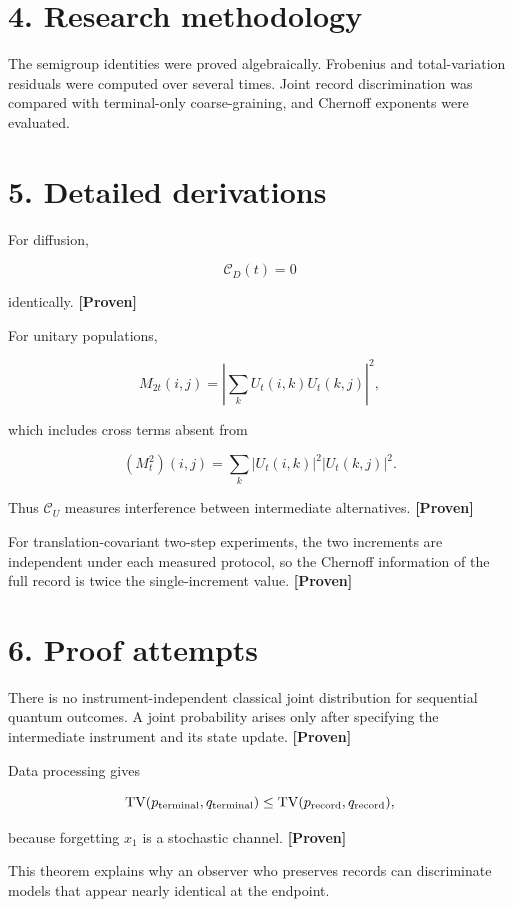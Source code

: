 \documentclass[11pt,a4paper,openany]{report}
\newcommand{\statusProven}{\textcolor{fingreen}{[Proven]}}
\begin{document}
\section{4. Research methodology}

The semigroup identities were proved algebraically. Frobenius and total-variation residuals were computed over several times. Joint record discrimination was compared with terminal-only coarse-graining, and Chernoff exponents were evaluated.

\section{5. Detailed derivations}

For diffusion,

\[
\mathcal C_D(t)=0
\]

identically. \textbf{\statusProven{}}

For unitary populations,

\[
M_{2t}(i,j)
=\left|\sum_kU_t(i,k)U_t(k,j)\right|^2,
\]

which includes cross terms absent from

\[
(M_t^2)(i,j)
=\sum_k|U_t(i,k)|^2|U_t(k,j)|^2.
\]

Thus \(\mathcal C_U\) measures interference between intermediate alternatives. \textbf{\statusProven{}}

For translation-covariant two-step experiments, the two increments are independent under each measured protocol, so the Chernoff information of the full record is twice the single-increment value. \textbf{\statusProven{}}

\section{6. Proof attempts}

There is no instrument-independent classical joint distribution for sequential quantum outcomes. A joint probability arises only after specifying the intermediate instrument and its state update. \textbf{\statusProven{}}

Data processing gives

\[
\operatorname{TV}(p_{\rm terminal},q_{\rm terminal})
\le
\operatorname{TV}(p_{\rm record},q_{\rm record}),
\]

because forgetting \(x_1\) is a stochastic channel. \textbf{\statusProven{}}

This theorem explains why an observer who preserves records can discriminate models that appear nearly identical at the endpoint.
\end{document}
